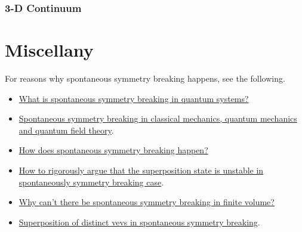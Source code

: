 \documentclass{article}
\begin{document}
\subsubsection{3-D Continuum}


\section{Miscellany}

For reasons why spontaneous symmetry breaking happens, see the following.
\begin{itemize}
    \item \href{https://physics.stackexchange.com/questions/29311/what-is-spontaneous-symmetry-breaking-in-quantum-systems}{What is spontaneous symmetry breaking in quantum systems?}
    \item \href{https://physics.stackexchange.com/questions/69289/spontaneous-symmetry-breaking-in-classical-mechanics-quantum-mechanics-and-quan}{Spontaneous symmetry breaking in classical mechanics, quantum mechanics and quantum field theory}.
    \item \href{https://physics.stackexchange.com/questions/550571/how-does-spontaneous-symmetry-breaking-happen}{How does spontaneous symmetry breaking happen?}
    \item \href{https://physics.stackexchange.com/questions/373931/how-to-rigorously-argue-that-the-superposition-state-is-unstable-in-spontaneousl}{How to rigorously argue that the superposition state is unstable in spontaneously symmetry breaking case}.
    \item \href{https://www.physicsforums.com/threads/why-cant-there-be-spontaneous-symmetry-breaking-in-finite-volume.281170/}{Why can't there be spontaneous symmetry breaking in finite volume?}
    \item \href{https://physics.stackexchange.com/questions/243291/superposition-of-distinct-vevs-in-spontaneous-symmetry-breaking}{Superposition of distinct vevs in spontaneous symmetry breaking}.
\end{itemize}

% 
% 
\end{document}
